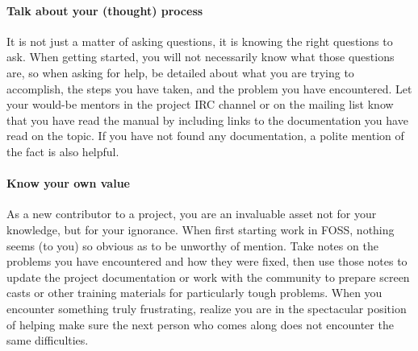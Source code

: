 \paragraph*{Talk about your (thought) process} It is not just a matter of asking
questions, it is knowing the right questions to ask. When getting started, you
will not necessarily know what those questions are, so when asking for help, be
detailed about what you are trying to accomplish, the steps you have taken, and
the problem you have encountered. Let your would-be mentors in the project IRC
channel or on the mailing list know that you have read the manual by including
links to the documentation you have read on the topic. If you have not found any
documentation, a polite mention of the fact is also helpful.

\paragraph*{Know your own value} As a new contributor to a project, you are an
invaluable asset not for your knowledge, but for your ignorance. When first
starting work in FOSS, nothing seems (to you) so obvious as to be unworthy of
mention. Take notes on the problems you have encountered and how they were
fixed, then use those notes to update the project documentation or work with the
community to prepare screen casts or other training materials for particularly
tough problems. When you encounter something truly frustrating, realize you are
in the spectacular position of helping make sure the next person who comes along
does not encounter the same difficulties.
